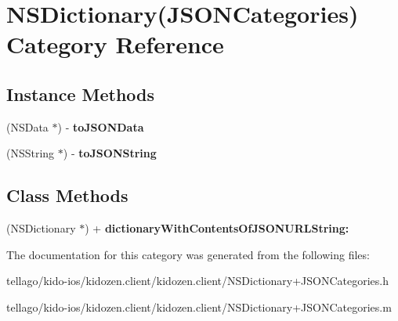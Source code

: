 \hypertarget{category_n_s_dictionary_07_j_s_o_n_categories_08}{\section{N\-S\-Dictionary(J\-S\-O\-N\-Categories) Category Reference}
\label{category_n_s_dictionary_07_j_s_o_n_categories_08}
}
\subsection*{Instance Methods}
\begin{DoxyCompactItemize}
\item 
\hypertarget{category_n_s_dictionary_07_j_s_o_n_categories_08_a9c1801cffb815503b7aa7762305928a8}{(N\-S\-Data $\ast$) -\/ {\bfseries to\-J\-S\-O\-N\-Data}}\label{category_n_s_dictionary_07_j_s_o_n_categories_08_a9c1801cffb815503b7aa7762305928a8}

\item 
\hypertarget{category_n_s_dictionary_07_j_s_o_n_categories_08_a4e61bc3943558ccd71328d42dd5b10e0}{(N\-S\-String $\ast$) -\/ {\bfseries to\-J\-S\-O\-N\-String}}\label{category_n_s_dictionary_07_j_s_o_n_categories_08_a4e61bc3943558ccd71328d42dd5b10e0}

\end{DoxyCompactItemize}
\subsection*{Class Methods}
\begin{DoxyCompactItemize}
\item 
\hypertarget{category_n_s_dictionary_07_j_s_o_n_categories_08_aa3c55994938a4cbedf54ac22ee4b7b8c}{(N\-S\-Dictionary $\ast$) + {\bfseries dictionary\-With\-Contents\-Of\-J\-S\-O\-N\-U\-R\-L\-String\-:}}\label{category_n_s_dictionary_07_j_s_o_n_categories_08_aa3c55994938a4cbedf54ac22ee4b7b8c}

\end{DoxyCompactItemize}


The documentation for this category was generated from the following files\-:\begin{DoxyCompactItemize}
\item 
tellago/kido-\/ios/kidozen.\-client/kidozen.\-client/N\-S\-Dictionary+\-J\-S\-O\-N\-Categories.\-h\item 
tellago/kido-\/ios/kidozen.\-client/kidozen.\-client/N\-S\-Dictionary+\-J\-S\-O\-N\-Categories.\-m\end{DoxyCompactItemize}
